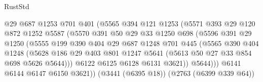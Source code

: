 \begin{lexlean}{RustStd}
\begin{coremodule}
                              @29
                              @687
                              @1253
                              @701
                              @401
                              (@5565
                                @394
                                @121
                                @1253
                                (@5571
                                  @393
                                  @29
                                  @120
                                  @872
                                  @1252
                                  @5587
                                  (@5570
                                    @391
                                    @50
                                    @29
                                    @33
                                    @1250
                                    @698
                                    (@5596
                                      @391
                                      @29
                                      @1250
                                      (@5555
                                        @199
                                        @390
                                        @404
                                        @29
                                        @687
                                        @1248
                                        @701
                                        @445
                                        (@5565
                                          @390
                                          @404
                                          @1248
                                          (@5628
                                            @186
                                            @29
                                            @403
                                            @801
                                            @1247
                                            @5641
                                            (@5613 @50 @27 @33 @854 @698 @5626 @5644)))
                                        @6122
                                        @6125
                                        @6128
                                        @6131
                                        @3621))
                                    @5644)))
                              @6141
                              @6144
                              @6147
                              @6150
                              @3621))
                          (@3441 (@6395 @18))
                          (@2763 (@6399 @339 @64))

\end{coremodule}
\end{lexlean}
